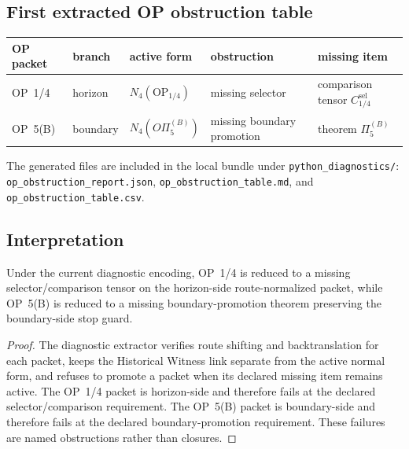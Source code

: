\subsection{First extracted OP obstruction table}
\label{subsec:v410r02-first-extracted-op-obstruction-table}

\begin{center}
\small
\setlength{\tabcolsep}{3pt}
\begin{tabular}{@{}p{}P{0.12\textwidth}P{0.18\textwidth}P{0.23\textwidth}P{0.21\textwidth}@{}}
\toprule
OP packet & branch & active form & obstruction & missing item\\
\midrule
OP~1/4 & horizon & $N_4(\mathrm{OP}_{1/4})$ & missing selector & comparison tensor $C_{1/4}^{\mathrm{sel}}$ \\
OP~5(B) & boundary & $N_4(O\Pi_{5}^{(B)})$ & missing boundary promotion & theorem $\Pi_{5}^{(B)}$ \\
\bottomrule
\end{tabular}
\end{center}

The generated files are included in the local bundle under
\texttt{python\_diagnostics/}: \texttt{op\_obstruction\_report.json},
\texttt{op\_obstruction\_table.md}, and \texttt{op\_obstruction\_table.csv}.

\subsection{Interpretation}
\label{subsec:v410r02-first-op-obstruction-interpretation}

\begin{proposition}
\label{prop:v410r02-first-op-obstruction-localization}
Under the current diagnostic encoding, OP~1/4 is reduced to a missing
selector/comparison tensor on the horizon-side route-normalized packet, while
OP~5(B) is reduced to a missing boundary-promotion theorem preserving the
boundary-side stop guard.
\end{proposition}

\begin{proof}
The diagnostic extractor verifies route shifting and backtranslation for each
packet, keeps the Historical Witness link separate from the active normal
form, and refuses to promote a packet when its declared missing item remains
active. The OP~1/4 packet is horizon-side and therefore fails at the declared
selector/comparison requirement. The OP~5(B) packet is boundary-side and
therefore fails at the declared boundary-promotion requirement. These failures
are named obstructions rather than closures.
\end{proof}


